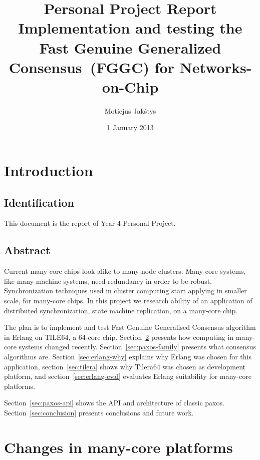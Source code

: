 \documentclass[english,11pt]{article}
\newcommand{\fggc}{Fast Genuine Generalized Consensus}
\begin{document}
\title{Personal Project Report\\
    Implementation and testing the \fggc\ (FGGC) for Networks-on-Chip}
\author{Motiejus Jakštys}
\date{1 January 2013}

\maketitle
\pagebreak
\tableofcontents
\pagebreak

\section{Introduction}
\subsection{Identification}

This document is the report of Year 4 Personal Project.

\subsection{Abstract}

Current many-core chips look alike to many-node clusters. Many-core systems,
like many-machine systems, need redundancy in order to be robust.
Synchronization techniques used in cluster computing start applying in smaller
scale, for many-core chips. In this project we research ability of an
application of distributed synchronization, state machine replication, on a
many-core chip.

The plan is to implement and test Fast Genuine Generalised Consensus algorithm
in Erlang on TILE64, a 64-core chip. Section~\ref{sec:many-core} presents how
computing in many-core systems changed recently. Section~\ref{sec:paxos-family}
presents what consensus algorithms are. Section~\ref{sec:erlang-why} explains
why Erlang was chosen for this application, section~\ref{sec:tilera} shows why
Tilera64 was chosen as development platform, and section~\ref{sec:erlang-eval}
evaluates Erlang suitability for many-core platforms.

Section~\ref{sec:paxos-api} shows the API and architecture of classic paxos.
Section~\ref{sec:conclusion} presents conclusions and future work.

\section{Changes in many-core platforms}
\label{sec:many-core}
\end{document}
